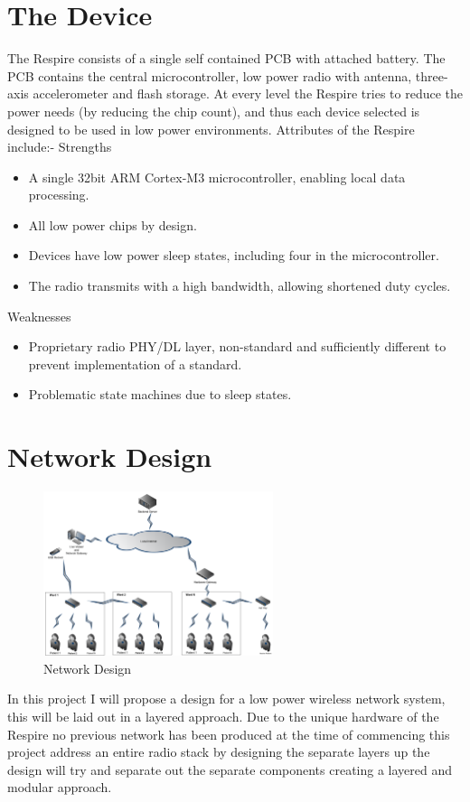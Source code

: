 \section{The Device}
The Respire consists of a single self contained \ac{PCB} with attached battery. The PCB contains the
central microcontroller, low power radio with antenna, three-axis accelerometer and flash storage.
At every level the Respire tries to reduce the power needs (\eg by reducing the chip count), and thus
each device selected is designed to be used in low power environments. Attributes of the Respire
include:-
Strengths
\begin{itemize}
  \item A single 32bit ARM Cortex-M3 microcontroller, enabling local data processing.
  \item All low power chips by design.
  \item Devices have low power sleep states, including four in the microcontroller.
  \item The radio transmits with a high bandwidth, allowing shortened duty cycles.
\end{itemize}
Weaknesses
\begin{itemize}
  \item Proprietary radio \ac{PHY}/\ac{DL} layer, non-standard and sufficiently different to prevent implementation of a standard.
  \item Problematic state machines due to sleep states.
\end{itemize}

\section{Network Design}
\begin{figure}
  \vspace{-10pt}
  \begin{center}
    \includegraphics[width=0.6\textwidth, keepaspectratio=true]{images/respire_network.png}
  \end{center}
  \caption{Network Design}
  \vspace{-10pt}
\end{figure}
In this project I will propose a design for a low power wireless network system, this will be laid out in
a layered approach. Due to the unique hardware of the Respire no previous network has been
produced at the time of commencing this project address an entire radio stack by designing the
separate layers up the design will try and separate out the separate components creating a layered
and modular approach.

